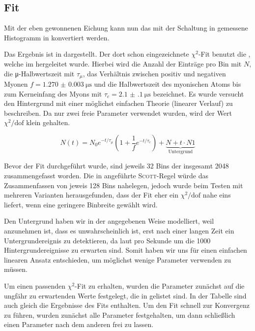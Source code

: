 \subsection{Fit}
\label{sec:fit}

Mit der eben gewonnenen Eichung kann nun das mit der Schaltung in
 gemessene Histogramm in  konvertiert werden.

Das Ergebnis ist in  dargestellt. Der dort schon eingezeichnete
$\chi^2$-Fit benutzt die , welche im \cite[Gl. 12]{script} hergeleitet wurde.
Hierbei wird die Anzahl der Einträge pro Bin mit $N$, die μ-Halbwertszeit mit
$τ_μ$, das Verhältnis zwischen positiv und negativen Myonen
$f = \SI{1.270(3)}{\micro\second}$ und die Halbwertszeit des myonischen Atoms
bis zum Kerneinfang des Myons mit $τ_c = \SI{2.1(1)}{\micro\second}$ bezeichnet.
Es wurde versucht den Hintergrund mit einer möglichst einfachen Theorie
(linearer Verlauf) zu beschreiben. Da nur zwei freie Parameter verwendet wurden,
wird der Wert $\chi^2/\mbox{dof}$ klein gehalten.

\begin{equation}
  N(t) = N_0 e^{-t/τ_μ}\left(1+\frac{1}{f}e^{-t/τ_c}\right) + \underbrace{N+t\cdot N1}_{\mbox{Untergrund}}
  \label{eqn:fit}
\end{equation}

Bevor der Fit durchgeführt wurde, sind jeweils 32 Bins der insgesamt 2048
zusammengefasst worden. Die in \cite[Gl. 17]{script} angeführte \textsc{Scott}-Regel
würde das Zusammenfassen von jeweis 128 Bins nahelegen, jedoch wurde beim Testen
mit mehreren Varianten herausgefunden, dass der Fit eher ein  $\chi^2/\mbox{dof}$
nahe eins liefert, wenn eine geringere Binbreite gewählt wird.

Den Untergrund haben wir in der angegebenen Weise modelliert, weil anzunehmen
ist, dass es unwahrscheinlich ist, erst nach einer langen Zeit ein
Untergrundereignis zu detektieren, da laut  pro
Sekunde um die 1000 Hintergrundereignisse zu erwarten sind. Somit haben wir uns
für einen einfachen linearen Ansatz entschieden, um möglichst wenige Parameter
verwenden zu müssen.

Um einen passenden $χ^2$-Fit zu erhalten, wurden die Parameter zunächst auf
die ungfähr zu erwartenden Werte festgelegt, die in  gelistet
sind. In der Tabelle sind auch gleich die Ergebnisse des Fits enthalten.
Um den Fit schnell zur Konvergenz zu führen, wurden zunächst alle Parameter
festgehalten, um dann schließlich einen Parameter nach dem anderen frei zu lassen.


